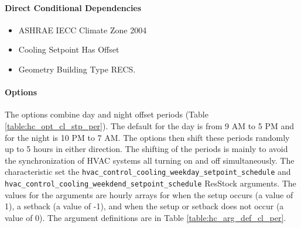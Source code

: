 \paragraph{Direct Conditional Dependencies}
\begin{itemize}
    \item ASHRAE IECC Climate Zone 2004
    \item Cooling Setpoint Has Offset
    \item Geometry Building Type RECS.
\end{itemize}

\paragraph{Options}
The options combine day and night offset periods (Table \ref{table:hc_opt_cl_stp_per}). The default for the day is from 9 AM to 5 PM and for the night is 10 PM to 7 AM. The options then shift these periods randomly up to 5 hours in either direction. The shifting of the periods is mainly to avoid the synchronization of HVAC systems all turning on and off simultaneously. The characteristic set the \texttt{hvac\_control\_cooling\_weekday\_setpoint\_schedule} and \texttt{hvac\_control\_cooling\_weekdend\_setpoint\_schedule} ResStock arguments. The values for the arguments are hourly arrays for when the setup occurs (a value of 1), a setback (a value of -1), and when the setup or setback does not occur (a value of 0). The argument definitions are in Table \ref{table:hc_arg_def_cl_per}.

